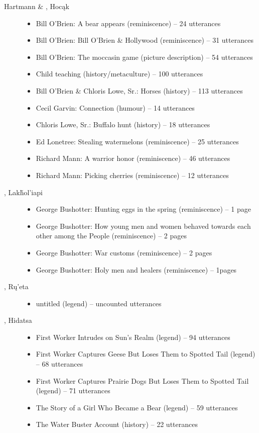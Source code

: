 \documentclass[output=paper]{LSP/langsci}
\begin{document}
\begin{description}
\item[Hartmann \& \citet{Marschke2010}, Hocąk]\hfill
\begin{itemize}
\item Bill O’Brien: A bear appears (reminiscence) -- 24 utterances
\item Bill O’Brien: Bill O’Brien \& Hollywood (reminiscence) -- 31 utterances
\item Bill O’Brien: The moccasin game (picture description) -- 54 utterances
\item Child teaching (history/metaculture) -- 100 utterances
\item Bill O’Brien \& Chloris Lowe, Sr.: Horses (history) -- 113 utterances
\item Cecil Garvin: Connection (humour) -- 14 utterances
\item Chloris Lowe, Sr.: Buffalo hunt (history) -- 18 utterances
\item Ed Lonetree: Stealing watermelons (reminiscence) -- 25 utterances
\item Richard Mann: A warrior honor (reminiscence) -- 46 utterances
\item Richard Mann: Picking cherries (reminiscence) -- 12 utterances
\end{itemize}

\item[\citet{Ingham2003}, Lakȟol’iapi]\hfill
\begin{itemize}
\item George Bushotter: Hunting eggs in the spring (reminiscence) -- 1 page
\item George Bushotter: How young men and women behaved towards each other among the People (reminiscence) -- 2 pages
\item George Bushotter: War customs (reminiscence) -- 2 pages
\item George Bushotter: Holy men and healers (reminiscence) -- 1\textonehalf{}pages
\end{itemize}

\item[\citet{Kennard1936}, Rų’eta]\hfill
\begin{itemize}
\item untitled (legend) -- uncounted utterances
\end{itemize}

\item[\citet{Lowie1939}, Hidatsa]\hfill
\begin{itemize}
\item First Worker Intrudes on Sun’s Realm (legend) -- 94 utterances
\item First Worker Captures Geese But Loses Them to Spotted Tail (legend) -- 68 utterances
\item First Worker Captures Prairie Dogs But Loses Them to Spotted Tail (legend) -- 71 utterances
\item The Story of a Girl Who Became a Bear (legend) -- 59 utterances
\item The Water Buster Account (history) -- 22 utterances
\end{itemize}


\end{description}
\end{document}
